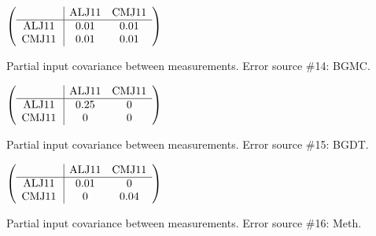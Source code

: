 \begin{table}[H]
\scriptsize
\begin{center}
\renewcommand{\arraystretch}{1.1}
\begin{math}\left(\begin{array}{c|cc}
 & \mathrm{ALJ11} & 
\mathrm{CMJ11} \\
\hline
\mathrm{ALJ11} \hspace*{2pt} &       0.01 &       0.01 \\
\mathrm{CMJ11} \hspace*{2pt} &       0.01 &       0.01 \\
\end{array}\right)\end{math}
\caption{Partial input covariance between measurements. Error source \#14: BGMC.}
\renewcommand{\arraystretch}{1}
\end{center}
\end{table}
\begin{table}[H]
\scriptsize
\begin{center}
\renewcommand{\arraystretch}{1.1}
\begin{math}\left(\begin{array}{c|cc}
 & \mathrm{ALJ11} & 
\mathrm{CMJ11} \\
\hline
\mathrm{ALJ11} \hspace*{2pt} &       0.25 &  0 \\
\mathrm{CMJ11} \hspace*{2pt} &  0 &  0 \\
\end{array}\right)\end{math}
\caption{Partial input covariance between measurements. Error source \#15: BGDT.}
\renewcommand{\arraystretch}{1}
\end{center}
\end{table}
\begin{table}[H]
\scriptsize
\begin{center}
\renewcommand{\arraystretch}{1.1}
\begin{math}\left(\begin{array}{c|cc}
 & \mathrm{ALJ11} & 
\mathrm{CMJ11} \\
\hline
\mathrm{ALJ11} \hspace*{2pt} &       0.01 &  0 \\
\mathrm{CMJ11} \hspace*{2pt} &  0 &       0.04 \\
\end{array}\right)\end{math}
\caption{Partial input covariance between measurements. Error source \#16: Meth.}
\renewcommand{\arraystretch}{1}
\end{center}
\end{table}
